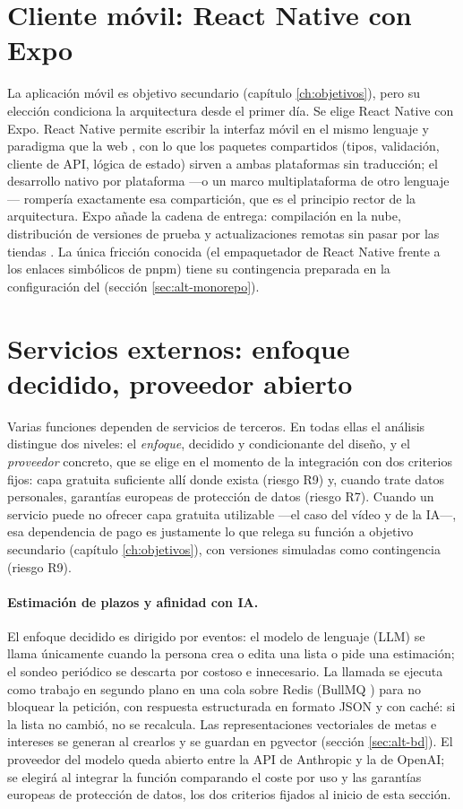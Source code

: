 \section{Cliente móvil: React Native con Expo}
\label{sec:alt-movil}

La aplicación móvil es objetivo secundario (capítulo \ref{ch:objetivos}), pero su elección condiciona la arquitectura desde el primer día.
Se elige React Native con Expo.
React Native permite escribir la interfaz móvil en el mismo lenguaje y paradigma que la web \parencite{react-native-docs}, con lo que los paquetes compartidos (tipos, validación, cliente de \ac{API}, lógica de estado) sirven a ambas plataformas sin traducción; el desarrollo nativo por plataforma —o un marco multiplataforma de otro lenguaje— rompería exactamente esa compartición, que es el principio rector de la arquitectura.
Expo añade la cadena de entrega: compilación en la nube, distribución de versiones de prueba y actualizaciones remotas sin pasar por las tiendas \parencite{expo-docs}.
La única fricción conocida (el empaquetador de React Native frente a los enlaces simbólicos de pnpm) tiene su contingencia preparada en la configuración del  (sección \ref{sec:alt-monorepo}).

\section{Servicios externos: enfoque decidido, proveedor abierto}
\label{sec:alt-servicios}

Varias funciones dependen de servicios de terceros.
En todas ellas el análisis distingue dos niveles: el \emph{enfoque}, decidido y condicionante del diseño, y el \emph{proveedor} concreto, que se elige en el momento de la integración con dos criterios fijos: capa gratuita suficiente allí donde exista (riesgo R9) y, cuando trate datos personales, garantías europeas de protección de datos (riesgo R7).
Cuando un servicio puede no ofrecer capa gratuita utilizable —el caso del vídeo y de la \ac{IA}—, esa dependencia de pago es justamente lo que relega su función a objetivo secundario (capítulo \ref{ch:objetivos}), con versiones simuladas como contingencia (riesgo R9).

\paragraph{Estimación de plazos y afinidad con \ac{IA}.}
El enfoque decidido es dirigido por eventos: el modelo de lenguaje (\ac{LLM}) se llama únicamente cuando la persona crea o edita una lista o pide una estimación; el sondeo periódico se descarta por costoso e innecesario.
La llamada se ejecuta como trabajo en segundo plano en una cola sobre Redis (BullMQ \parencite{bullmq-docs}) para no bloquear la petición, con respuesta estructurada en formato \ac{JSON} y con caché: si la lista no cambió, no se recalcula.
Las representaciones vectoriales de metas e intereses se generan al crearlos y se guardan en pgvector (sección \ref{sec:alt-bd}).
El proveedor del modelo queda abierto entre la \ac{API} de Anthropic y la de OpenAI; se elegirá al integrar la función comparando el coste por uso y las garantías europeas de protección de datos, los dos criterios fijados al inicio de esta sección.

